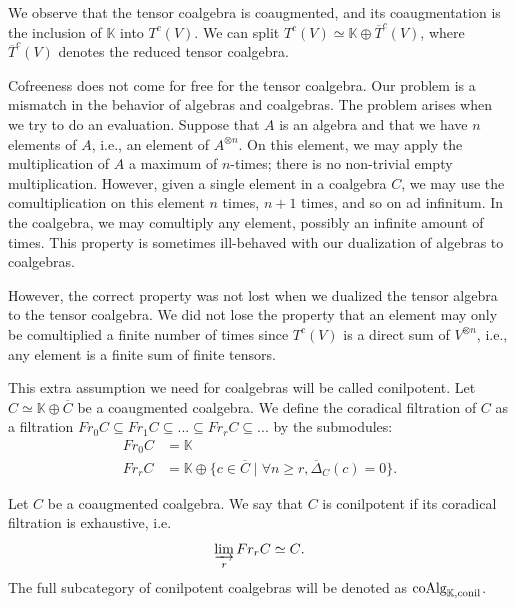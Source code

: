 \documentclass[../thesis.tex]{subfiles}
\begin{document}
            We observe that the tensor coalgebra is coaugmented, and its coaugmentation is the inclusion of $\mathbb{K}$ into $T^c(V)$. We can split $T^c(V) \simeq \mathbb{K}\oplus \overline{T}^c(V)$, where $\overline{T}^c(V)$ denotes the reduced tensor coalgebra.

            Cofreeness does not come for free for the tensor coalgebra. Our problem is a mismatch in the behavior of algebras and coalgebras. The problem arises when we try to do an evaluation. Suppose that $A$ is an algebra and that we have $n$ elements of $A$, i.e., an element of $A^{\otimes n}$. On this element, we may apply the multiplication of $A$ a maximum of $n$-times; there is no non-trivial empty multiplication. However, given a single element in a coalgebra $C$, we may use the comultiplication on this element $n$ times, $n+1$ times, and so on ad infinitum. In the coalgebra, we may comultiply any element, possibly an infinite amount of times. This property is sometimes ill-behaved with our dualization of algebras to coalgebras. 
            
            However, the correct property was not lost when we dualized the tensor algebra to the tensor coalgebra. We did not lose the property that an element may only be comultiplied a finite number of times since $T^c(V)$ is a direct sum of $V^{\otimes n}$, i.e., any element is a finite sum of finite tensors.
            
            This extra assumption we need for coalgebras will be called conilpotent. Let $C \simeq \mathbb{K} \oplus \overline{C}$ be a coaugmented coalgebra. We define the coradical filtration of $C$ as a filtration $Fr_0C \subseteq Fr_1C \subseteq ... \subseteq Fr_rC \subseteq ...$ by the submodules:
            \begin{align*}
                Fr_0C & = \mathbb{K} \\
                Fr_rC & = \mathbb{K} \oplus \{c\in\overline{C}\mid \forall n\geq r, \overline{\Delta}_C(c) = 0\}.
            \end{align*}

            \begin{definition}
                Let $C$ be a coaugmented coalgebra. We say that $C$ is conilpotent if its coradical filtration is exhaustive, i.e.
                \begin{align*}
                    \varinjlim_rFr_rC \simeq C\tt{.}
                \end{align*}
                The full subcategory of conilpotent coalgebras will be denoted as $\tt{coAlg}_{\mathbb{K},\tt{conil}}$.
            \end{definition}
            
\end{document}
